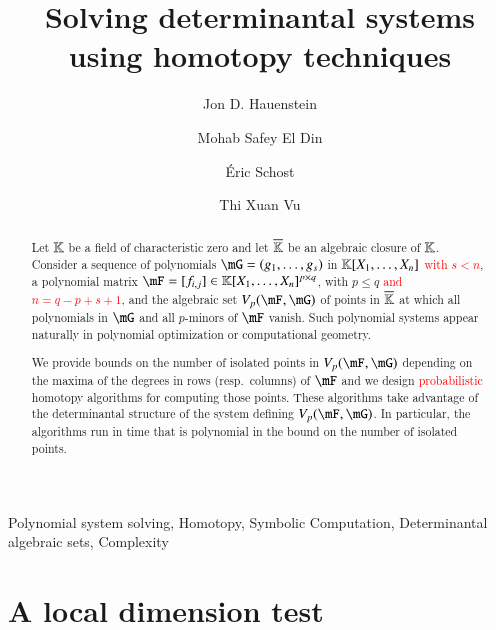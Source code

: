 \documentclass[amsthm]{elsart}
\def\added#1{\textcolor{red}{#1}}
\begin{document}
\begin{frontmatter}
\title{Solving determinantal systems using 
homotopy techniques}
\author{Jon D. Hauenstein}
\address{Department of Applied and Computational Mathematics and Statistics, University of Notre Dame, USA}
\author{Mohab {Safey El Din}}
\address{Sorbonne Universit\'e, CNRS, Laboratoire d'Informatique de Paris 6, PolSys, Paris, France}
\author{\'Eric Schost}
\address{David Cheriton School of Computer Science, University of Waterloo, ON, Canada}
\author{Thi Xuan Vu}
\address{Sorbonne Universit\'e, CNRS, Laboratoire d'Informatique de Paris
  6, PolSys, Paris, France and David Cheriton School of Computer Science, University of Waterloo, ON, Canada}

\begin{abstract}
  Let $\mathbb{K}$ be a field of characteristic zero and let $\overline{\mathbb{K}}$ be an algebraic
  closure of $\mathbb{K}$. Consider a sequence of polynomials $\mG=(g_1,\dots,g_s)$ in
  $\mathbb{K}[X_1,\dots,X_n]$ \added{with $s < n$}, a polynomial matrix $\mF=[f_{i,j}] \in
  \KK[X_1,\dots,X_n]^{p \times q}$, with $p \leq q$ \added{and $n=q-p+s+1$}, and the algebraic set
  $\VpFG{p}{\mF}{\mG}$ of points in $\overline{\mathbb{K}}$ at which all polynomials in $\mG$
  and all $p$-minors of $\mF$ vanish. Such polynomial systems appear naturally
  in polynomial optimization or computational geometry.

  We provide bounds on the number of isolated points in $\VpFG{p}{\mF}{\mG}$
  depending on the maxima of the degrees in rows (resp.\ columns) of $\mF$ and
  we design \added{probabilistic} homotopy algorithms for computing those
  points. These algorithms take advantage of the determinantal structure of the
  system defining $\VpFG{p}{\mF}{\mG}$. In particular, the algorithms run in
  time that is polynomial in the bound on the number of isolated points.
\end{abstract}
\begin{keyword}
  Polynomial system solving, Homotopy, Symbolic Computation, Determinantal
  algebraic sets, Complexity
\end{keyword}
\end{frontmatter}
\endNoHyper



\section{A local dimension test} \label{sec:isolated}
\end{document}
